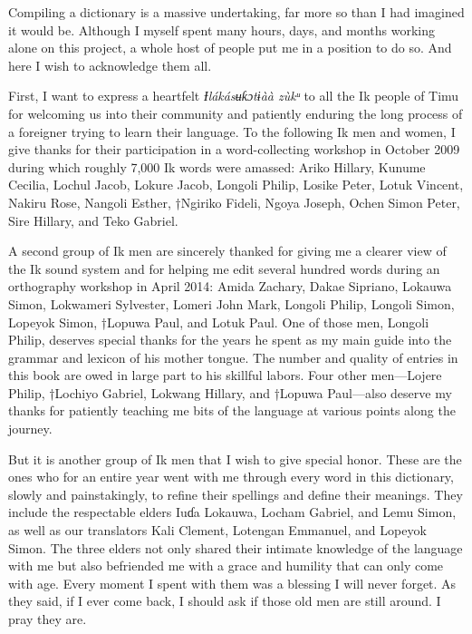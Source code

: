 
Compiling a dictionary is a massive undertaking, far more so than I had imagined it would be. Although I myself spent many hours, days, and months working alone on this project, a whole host of people put me in a position to do so. And here I wish to acknowledge them all.

First, I want to express a heartfelt \textit{Ɨ}\textit{lákásʉƙɔtɨàà zùkᵘ} to all the Ik people of Timu for welcoming us into their community and patiently enduring the long process of a foreigner trying to learn their language. To the following Ik men and women, I give thanks for their participation in a word-collecting workshop in October 2009 during which roughly 7,000 Ik words were amassed: Ariko Hillary, Kunume Cecilia, Lochul Jacob, Lokure Jacob, Longoli Philip, Losike Peter, Lotuk Vincent, Nakiru Rose, Nangoli Esther, †Ngiriko Fideli, Ngoya Joseph, Ochen Simon Peter, Sire Hillary, and Teko Gabriel. 

A second group of Ik men are sincerely thanked for giving me a clearer view of the Ik sound system and for helping me edit several hundred words during an orthography workshop in April 2014: Amida Zachary, Dakae Sipriano, Lokauwa Simon, Lokwameri Sylvester, Lomeri John Mark, Longoli Philip, Longoli Simon, Lopeyok Simon, †Lopuwa Paul, and Lotuk Paul. One of those men, Longoli Philip, deserves special thanks for the years he spent as my main guide into the grammar and lexicon of his mother tongue. The number and quality of entries in this book are owed in large part to his skillful labors. Four other men—Lojere Philip, †Lochiyo Gabriel, Lokwang Hillary, and †Lopuwa Paul—also deserve my thanks for patiently teaching me bits of the language at various points along the journey.

But it is another group of Ik men that I wish to give special honor. These are the ones who for an entire year went with me through every word in this dictionary, slowly and painstakingly, to refine their spellings and define their meanings. They include the respectable elders Iuɗa Lokauwa, Locham Gabriel, and Lemu Simon, as well as our translators Kali Clement, Lotengan Emmanuel, and Lopeyok Simon. The three elders not only shared their intimate knowledge of the language with me but also befriended me with a grace and humility that can only come with age. Every moment I spent with them was a blessing I will never forget. As they said, if I ever come back, I should ask if those old men are still around. I pray they are.

